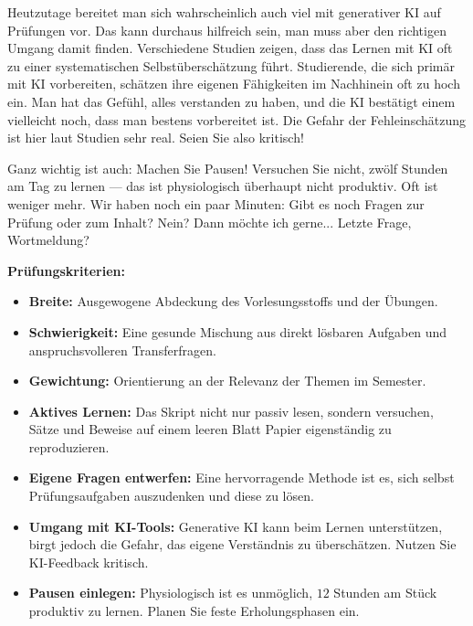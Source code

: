 \begin{spoken-clean}[01:26:29 - 01:26:54]
Heutzutage bereitet man sich wahrscheinlich auch viel mit generativer KI auf Prüfungen vor. Das kann durchaus hilfreich sein, man muss aber den richtigen Umgang damit finden. Verschiedene Studien zeigen, dass das Lernen mit KI oft zu einer systematischen Selbstüberschätzung führt. Studierende, die sich primär mit KI vorbereiten, schätzen ihre eigenen Fähigkeiten im Nachhinein oft zu hoch ein. Man hat das Gefühl, alles verstanden zu haben, und die KI bestätigt einem vielleicht noch, dass man bestens vorbereitet ist. Die Gefahr der Fehleinschätzung ist hier laut Studien sehr real. Seien Sie also kritisch!

Ganz wichtig ist auch: Machen Sie Pausen! Versuchen Sie nicht, zwölf Stunden am Tag zu lernen --- das ist physiologisch überhaupt nicht produktiv. Oft ist weniger mehr. Wir haben noch ein paar Minuten: Gibt es noch Fragen zur Prüfung oder zum Inhalt? Nein? Dann möchte ich gerne... Letzte Frage, Wortmeldung?
\end{spoken-clean}

\begin{math-stroke}
\textbf{Prüfungskriterien:}
\begin{itemize}
    \item \textbf{Breite:} Ausgewogene Abdeckung des Vorlesungsstoffs und der Übungen.
    \item \textbf{Schwierigkeit:} Eine gesunde Mischung aus direkt lösbaren Aufgaben und anspruchsvolleren Transferfragen.
    \item \textbf{Gewichtung:} Orientierung an der Relevanz der Themen im Semester.
\end{itemize}
\end{math-stroke}

\begin{nice-box}
\begin{itemize}
    \item \textbf{Aktives Lernen:} Das Skript nicht nur passiv lesen, sondern versuchen, Sätze und Beweise auf einem leeren Blatt Papier eigenständig zu reproduzieren.
    \item \textbf{Eigene Fragen entwerfen:} Eine hervorragende Methode ist es, sich selbst Prüfungsaufgaben auszudenken und diese zu lösen.
    \item \textbf{Umgang mit KI-Tools:} Generative KI kann beim Lernen unterstützen, birgt jedoch die Gefahr, das eigene Verständnis zu überschätzen. Nutzen Sie KI-Feedback kritisch.
    \item \textbf{Pausen einlegen:} Physiologisch ist es unmöglich, $12$ Stunden am Stück produktiv zu lernen. Planen Sie feste Erholungsphasen ein.
\end{itemize}
\end{nice-box}

